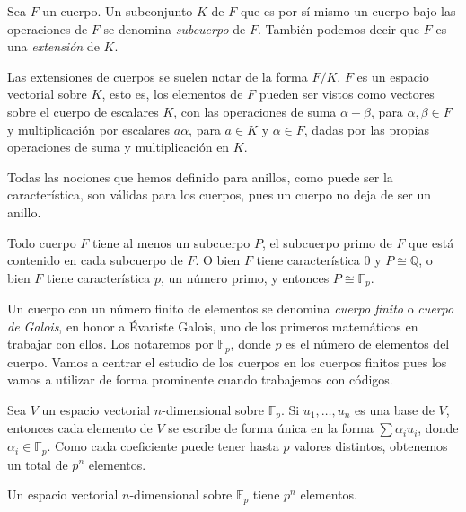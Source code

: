 
Sea \(F\) un cuerpo. Un subconjunto \(K\) de \(F\) que es por sí mismo un cuerpo bajo las operaciones de \(F\) se denomina \textit{subcuerpo} de \(F\).
También podemos decir que \(F\) es una \textit{extensión} de \(K\).

Las extensiones de cuerpos se suelen notar de la forma \(F/K\).
\(F\) es un espacio vectorial sobre \(K\), esto es, los elementos de \(F\) pueden ser vistos como vectores sobre el cuerpo de escalares \(K\), con las operaciones de suma \(\alpha + \beta\), para \(\alpha, \beta \in F\) y multiplicación por escalares \(a\alpha\), para \(a \in K\) y \(\alpha \in F\), dadas por las propias operaciones de suma y multiplicación en \(K\).

Todas las nociones que hemos definido para anillos, como puede ser la característica, son válidas para los cuerpos, pues un cuerpo no deja de ser un anillo.

\begin{theorem}
  \label{th:cuerpo-subcuerpo-primo-caracteristica}
  Todo cuerpo \(F\) tiene al menos un subcuerpo \(P\), el subcuerpo primo de \(F\) que está contenido en cada subcuerpo de \(F\).
  O bien \(F\) tiene característica \(0\) y \(P \cong \mathbb Q\), o bien \(F\) tiene característica \(p\), un número primo, y entonces \(P \cong \mathbb F_p\).
\end{theorem}



Un cuerpo con un número finito de elementos se denomina \textit{cuerpo finito} o \textit{cuerpo de Galois}, en honor a Évariste Galois, uno de los primeros matemáticos en trabajar con ellos. Los notaremos por \(\mathbb F_p\), donde \(p\) es el número de elementos del cuerpo.
Vamos a centrar el estudio de los cuerpos en los cuerpos finitos pues los vamos a utilizar de forma prominente cuando trabajemos con códigos.

Sea \(V\) un espacio vectorial \(n\)-dimensional sobre \(\mathbb F_p\).
Si \(u_1, \dots, u_n\) es una base de \(V\), entonces cada elemento de \(V\) se escribe de forma única en la forma \(\sum \alpha_iu_i\), donde \(\alpha_i \in \mathbb F_p\).
Como cada coeficiente puede tener hasta \(p\) valores distintos, obtenemos un total de \(p^n\) elementos.

\begin{lemma}
  Un espacio vectorial \(n\)-dimensional sobre \(\mathbb F_p\) tiene \(p^n\) elementos.
\end{lemma}

